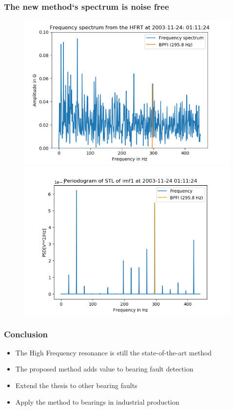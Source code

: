 \documentclass{beamer}
\begin{document}




\begin{frame}
	\frametitle{The new method`s spectrum is noise free    }
	\begin{figure}[H]
		\centering
		\includegraphics[width=0.5\linewidth]{method1}
		\includegraphics[width=0.5\linewidth]{method2}
	\end{figure}
\end{frame}



\begin{frame}
	\frametitle{Conclusion }
	\begin{itemize}
		\item The High Frequency resonance is still the state-of-the-art method 
		\item The proposed method adds value to bearing fault detection 
		\item Extend the thesis to other bearing faults
		\item Apply the method to bearings in industrial production
	\end{itemize}
\end{frame}

\end{document}
